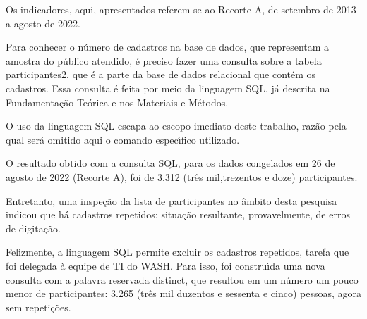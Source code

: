 \documentclass[
12pt,		%
openright,	%
twoside,  %
a4paper,			%
chapter=TITLE,		%
english,			%
french,				%
spanish,			%
brazil				%
]{USPSC-classe/USPSC}
\begin{document}
Os indicadores, aqui, apresentados referem-se ao Recorte A, de setembro de 2013 a agosto de 2022.









Para conhecer o n\'umero de cadastros na base de dados, que representam a amostra do p\'ublico atendido, \'e preciso fazer uma consulta sobre a tabela \textquotedbl participantes2\textquotedbl , que \'e a parte da base de dados relacional que cont\'em os cadastros. Essa consulta \'e feita por meio da linguagem SQL, j\'a descrita na Fundamenta\c{c}\~ao Te\'orica e nos Materiais e M\'etodos.









O uso da linguagem SQL escapa ao escopo imediato deste trabalho, raz\~ao pela qual ser\'a omitido aqui o comando espec\'{\i}fico utilizado.









O resultado obtido com a consulta SQL, para os dados congelados em 26 de agosto de 2022 (Recorte A), foi de 3.312 (tr\^es mil,trezentos e doze) participantes.









Entretanto, uma inspe\c{c}\~ao da lista de participantes no \^ambito desta pesquisa indicou que h\'a cadastros repetidos; situa\c{c}\~ao resultante, provavelmente, de erros de digita\c{c}\~ao.









Felizmente, a linguagem SQL permite excluir os cadastros repetidos, tarefa que foi delegada \`a equipe de TI do WASH. Para isso, foi constru\'{\i}da uma nova consulta com a palavra reservada \textquotedbl distinct\textquotedbl , que resultou em um n\'umero um pouco menor de participantes: 3.265 (tr\^es mil duzentos e sessenta e cinco) pessoas, agora sem repeti\c{c}\~oes.
\end{document}
